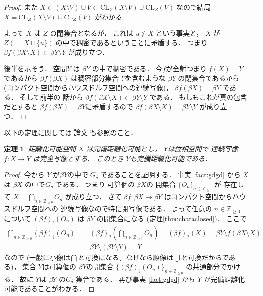 \documentclass[leqno, a4paper, 12pt]{jsarticle}
\newtheorem{thm}{定理}
\newcommand{\zz}{\mathbb{Z}}
\newcommand{\cl}{\mathrm{CL}}
\newcommand{\mysm}[1]{#1_{?}}
\begin{document}
\begin{proof}
また
$X\subset (X\setminus V)\cup V\subset \cl_{Z}(X\setminus V)\cup \cl_{Z}(V)$
なので結局
$X=\cl_{Z}(X\setminus V)\cup \cl_{Z}(V)$
がわかる．

よって
$X$
は
$Z$
の閉集合となるが，
これは
$u\not \in X$
という事実と，
$X$
が
$Z(=X\sqcup\{u\})$
の中で稠密であるということに矛盾する．
つまり
$\beta f(\beta X \setminus X)\subset \beta Y\setminus Y$
が成り立つ．

後半を示そう．
空間$Y$
は
$\beta Y$
の中で稠密である．
今$f$が全射つまり
$f(X)=Y$
であるから
$\beta f(\beta X)$
は稠密部分集合
$Y$を含むような
$\beta Y$
の閉集合であるから
(コンパクト空間からハウスドルフ空間への連続写像)，
$\beta f(\beta X)=\beta Y$
である．
そして前半の
話から
$\beta f(\beta X\setminus X)\subset 
\beta Y\setminus Y$
である．
もしもこれが真の包含だとすると
$\beta f(\beta X)=\beta Y$に矛盾するので
$\beta f(\beta X\setminus X)= 
\beta Y\setminus Y$
が成り立つ．
\end{proof}

以下の定理に関しては
論文
\cite{MR0822451}
も参照のこと．

\begin{thm}\label{thm:perfectkanbi}
距離化可能空間
$X$
は完備距離化可能とし，
$Y$は位相空間で
連続写像
$f\colon X\to Y$
は完全写像とする．
このとき
$Y$も完備距離化可能である．
\end{thm}
\begin{proof}
今から
$Y$
が$\beta Y$の中で
$G_{\delta}$
であることを証明する．
事実
\ref{fact:gdgd}
から
$X$は
$\beta X$
の中で$G_{\delta}$
である．
つまり
可算個の
$\beta X$の
開集合
$\{O_{n}\}_{n\in \zz_{\ge 0}}$
が
存在して
$X=\bigcap_{n\in \zz_{\ge 0}}O_{n}$
が成り立つ．
さて
$\beta f\colon \beta X\to \beta Y$
はコンパクト空間からハウスドルフ空間への
連続写像なので特に閉写像である．
よって任意の
$n\in \zz_{\ge 0}$
について
$\mysm{(\beta f)}(O_{n})$
は
$\beta Y$
の開集合になる
(定理\ref{thm:characlosed})．
ここで
\begin{align*}
\bigcap_{n\in \zz_{\ge 0}}\mysm{(\beta f)}(O_{n})
&=
\mysm{(\beta f)}\left(\bigcap_{n\in \zz_{\ge 0}}O_{n}\right)
=
\mysm{(\beta f)}(X)
=\beta Y\setminus f(\beta X\setminus X)\\
&=\beta Y \setminus (\beta Y\setminus Y)
=Y
\end{align*}
なので
(一般に小像は$\bigcap$と可換になる，なぜなら順像は$\bigcup$と可換だからである)，
集合
$Y$は可算個の
$\beta Y$の開集合
$\{\mysm{(\beta f)}(O_{n})\}_{n\in \zz_{\ge 0}}$
の共通部分でかける．
故に
$Y$は
$\beta Y$
の$G_{\delta}$
集合である．
再び事実
\ref{fact:gdgd}
から
$Y$
が完備距離化可能であることがわかる．
\end{proof}
\end{document}
